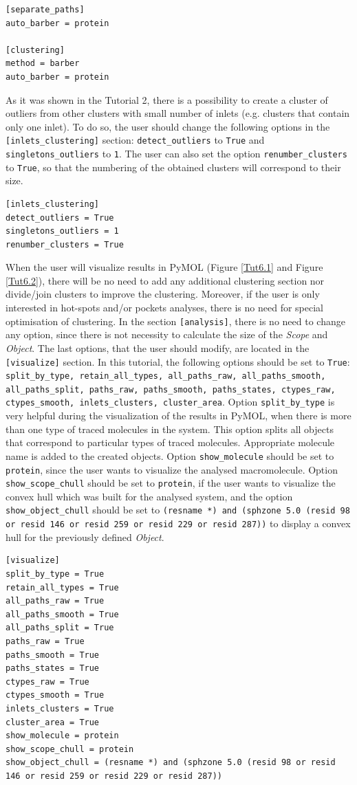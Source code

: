 \documentclass[9pt,tutorial, pubversion]{livecoms}
\begin{document}
\begin{lstlisting}
[separate_paths]
auto_barber = protein

[clustering]
method = barber
auto_barber = protein
\end{lstlisting}
As it was shown in the Tutorial 2, there is a possibility to create a cluster of outliers from other clusters with small number of inlets (e.g. clusters that contain only one inlet). To do so, the user should change the following options in the \texttt{[inlets\_clustering]} section: \texttt{detect\_outliers} to \texttt{True} and \texttt{singletons\_outliers} to \texttt{1}.  The user can also set the option \texttt{renumber\_clusters} to \texttt{True}, so that the numbering of the obtained clusters will correspond to their size.
\begin{lstlisting}
[inlets_clustering]
detect_outliers = True
singletons_outliers = 1
renumber_clusters = True
\end{lstlisting}
When the user will visualize results in PyMOL (Figure \ref{Tut6.1} and Figure \ref{Tut6.2}), there will be no need to add any additional clustering section nor divide/join clusters to improve the clustering. Moreover, if the user is only interested in hot-spots and/or pockets analyses, there is no need for special optimisation of clustering. 
In the section \texttt{[analysis]}, there is no need to change any option, since there is not necessity to calculate the size of the \emph{Scope} and \emph{Object}.
The last options, that the user should modify, are located in the \texttt{[visualize]} section. In this tutorial, the following options should be set to \texttt{True}: \texttt{split\_by\_type, retain\_all\_types, all\_paths\_raw, all\_paths\_smooth, all\_paths\_split, paths\_raw, paths\_smooth, paths\_states, ctypes\_raw, ctypes\_smooth, inlets\_clusters, cluster\_area}. Option \texttt{split\_by\_type} is very helpful during the visualization of the results in PyMOL, when there is more than one type of traced molecules in the system. This option splits all objects that correspond to particular types of traced molecules. Appropriate molecule name is added to the created objects. Option \texttt{show\_molecule} should be set to \texttt{protein}, since the user wants to visualize the analysed macromolecule. Option \texttt{show\_scope\_chull} should be set to \texttt{protein}, if the user wants to visualize the convex hull which was built for the analysed system, and the option \texttt{show\_object\_chull} should be set to \texttt{(resname *) and (sphzone 5.0 (resid 98 or resid 146 or resid 259 or resid 229 or resid 287))} to display a convex hull for the previously defined \emph{Object}. 
\begin{lstlisting}
[visualize]
split_by_type = True
retain_all_types = True
all_paths_raw = True
all_paths_smooth = True
all_paths_split = True
paths_raw = True
paths_smooth = True
paths_states = True
ctypes_raw = True
ctypes_smooth = True
inlets_clusters = True
cluster_area = True
show_molecule = protein
show_scope_chull = protein
show_object_chull = (resname *) and (sphzone 5.0 (resid 98 or resid 146 or resid 259 or resid 229 or resid 287))
\end{lstlisting}
\end{document}
